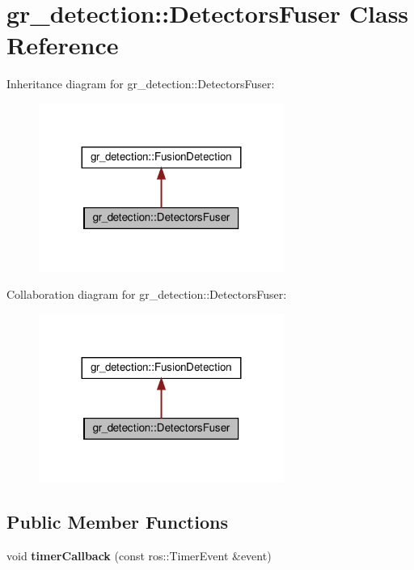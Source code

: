 \hypertarget{classgr__detection_1_1DetectorsFuser}{}\section{gr\+\_\+detection\+:\+:Detectors\+Fuser Class Reference}
\label{classgr__detection_1_1DetectorsFuser}


Inheritance diagram for gr\+\_\+detection\+:\+:Detectors\+Fuser\+:
\nopagebreak
\begin{figure}[H]
\begin{center}
\leavevmode
\includegraphics[width=227pt]{classgr__detection_1_1DetectorsFuser__inherit__graph}
\end{center}
\end{figure}


Collaboration diagram for gr\+\_\+detection\+:\+:Detectors\+Fuser\+:
\nopagebreak
\begin{figure}[H]
\begin{center}
\leavevmode
\includegraphics[width=227pt]{classgr__detection_1_1DetectorsFuser__coll__graph}
\end{center}
\end{figure}
\subsection*{Public Member Functions}
\begin{DoxyCompactItemize}
\item 
\mbox{\label{classgr__detection_1_1DetectorsFuser_a9174fe05a0301be19967b5a6386fd7f9}} 
void {\bfseries timer\+Callback} (const ros\+::\+Timer\+Event \&event)
\end{DoxyCompactItemize}


